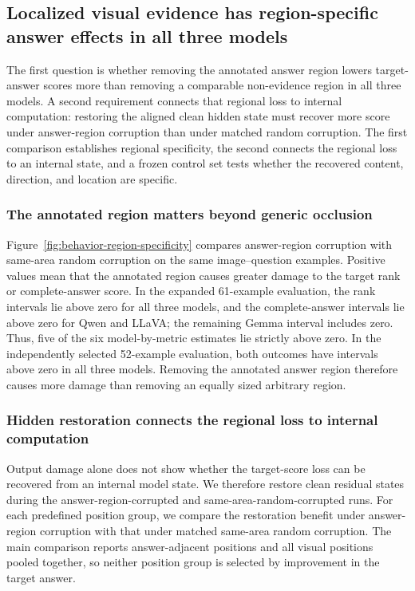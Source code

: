 \subsection{Localized visual evidence has region-specific answer effects in all three models}
\label{sec:shared-dependence}

The first question is whether removing the annotated answer region lowers target-answer scores more than removing a comparable non-evidence region in all three models. A second requirement connects that regional loss to internal computation: restoring the aligned clean hidden state must recover more score under answer-region corruption than under matched random corruption. The first comparison establishes regional specificity, the second connects the regional loss to an internal state, and a frozen control set tests whether the recovered content, direction, and location are specific.

\subsubsection{The annotated region matters beyond generic occlusion}

Figure~\ref{fig:behavior-region-specificity} compares answer-region corruption with same-area random corruption on the same image--question examples. Positive values mean that the annotated region causes greater damage to the target rank or complete-answer score. In the expanded 61-example evaluation, the rank intervals lie above zero for all three models, and the complete-answer intervals lie above zero for Qwen and LLaVA; the remaining Gemma interval includes zero. Thus, five of the six model-by-metric estimates lie strictly above zero. In the independently selected 52-example evaluation, both outcomes have intervals above zero in all three models. Removing the annotated answer region therefore causes more damage than removing an equally sized arbitrary region.

\subsubsection{Hidden restoration connects the regional loss to internal computation}

Output damage alone does not show whether the target-score loss can be recovered from an internal model state. We therefore restore clean residual states during the answer-region-corrupted and same-area-random-corrupted runs. For each predefined position group, we compare the restoration benefit under answer-region corruption with that under matched same-area random corruption. The main comparison reports answer-adjacent positions and all visual positions pooled together, so neither position group is selected by improvement in the target answer.

